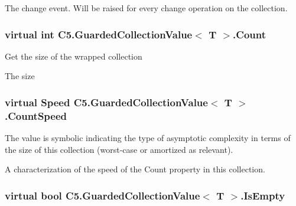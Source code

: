 The change event. Will be raised for every change operation on the collection. 

\hypertarget{class_c5_1_1_guarded_collection_value_a88d2c0a3a91c948b46417c1e60b45d44}{}
\subsubsection[{Count}]{\setlength{\rightskip}{0pt plus 5cm}virtual int {\bf C5.\+Guarded\+Collection\+Value}$<$ T $>$.Count\hspace{0.3cm}{\ttfamily [get]}}\label{class_c5_1_1_guarded_collection_value_a88d2c0a3a91c948b46417c1e60b45d44}


Get the size of the wrapped collection 

The size\hypertarget{class_c5_1_1_guarded_collection_value_a1faa5213b85114c0611a39744edf8887}{}
\subsubsection[{Count\+Speed}]{\setlength{\rightskip}{0pt plus 5cm}virtual {\bf Speed} {\bf C5.\+Guarded\+Collection\+Value}$<$ T $>$.Count\+Speed\hspace{0.3cm}{\ttfamily [get]}}\label{class_c5_1_1_guarded_collection_value_a1faa5213b85114c0611a39744edf8887}


The value is symbolic indicating the type of asymptotic complexity in terms of the size of this collection (worst-\/case or amortized as relevant). 

A characterization of the speed of the {\ttfamily Count} property in this collection.\hypertarget{class_c5_1_1_guarded_collection_value_aa567bdb55eab9d39405e1c09091afdbd}{}
\subsubsection[{Is\+Empty}]{\setlength{\rightskip}{0pt plus 5cm}virtual bool {\bf C5.\+Guarded\+Collection\+Value}$<$ T $>$.Is\+Empty\hspace{0.3cm}{\ttfamily [get]}}\label{class_c5_1_1_guarded_collection_value_aa567bdb55eab9d39405e1c09091afdbd}


